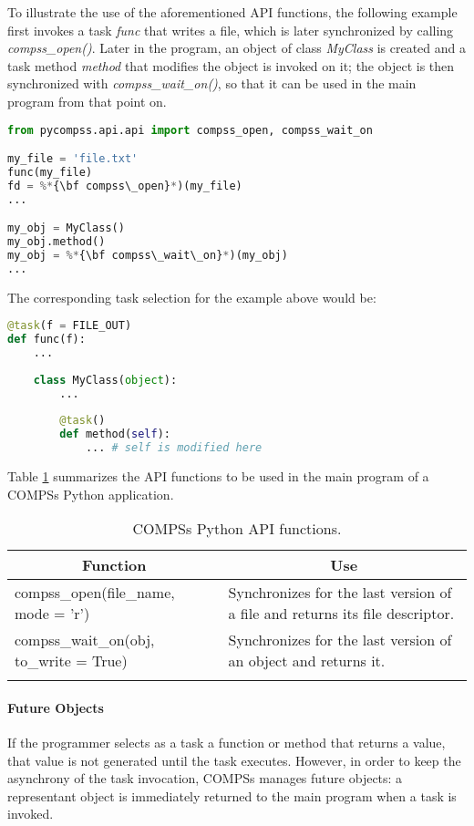 To illustrate the use of the aforementioned API functions, the following example first invokes a task 
{\it func} that writes a file, which is later synchronized by calling {\it compss\_open()}. 
Later in the program, an object of class {\it MyClass} is created and a task method {\it method} 
that modifies the object is invoked on it; the object is then synchronized with {\it compss\_wait\_on()}, 
so that it can be used in the main program from that point on.

\begin{lstlisting}[language=python]
from pycompss.api.api import compss_open, compss_wait_on

my_file = 'file.txt'
func(my_file)
fd = %*{\bf compss\_open}*)(my_file)
...

my_obj = MyClass()
my_obj.method()
my_obj = %*{\bf compss\_wait\_on}*)(my_obj)
...
\end{lstlisting}

The corresponding task selection for the example above would be:

\begin{lstlisting}[language=python]
@task(f = FILE_OUT)
def func(f):
    ...
    
    class MyClass(object):
        ...
        
        @task()
        def method(self):
            ... # self is modified here
\end{lstlisting}

Table \ref{tab:python_api_functions} summarizes the API functions to be used in the main program of a COMPSs Python application.
\bgroup
  \def\arraystretch{1.5}%
  \begin{longtable}{| p{} | p{} |}
    \hline
    \multicolumn{1}{|c|}{{\bf Function }}    &  \multicolumn{1}{c|}{{\bf Use }}\\
    \hline
    compss\_open(file\_name, mode = 'r') & Synchronizes for the last version of a file and returns its file descriptor. \\
    \hline
    compss\_wait\_on(obj, to\_write = True) & Synchronizes for the last version of an object and returns it. \\
    \hline
    \caption{COMPSs Python API functions.}
    \label{tab:python_api_functions}
  \end{longtable}
\egroup


\paragraph{Future Objects}
If the programmer selects as a task a function or method that returns a value, that value is not 
generated until the task executes. However, in order to keep the asynchrony of the task invocation, 
COMPSs manages future objects: a representant object is immediately returned to the main program when 
a task is invoked.

